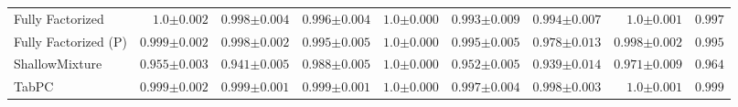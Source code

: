 \begin{tabular}{lrrrrrrr|r}
    \midrule
    Fully Factorized & $1.0${\tiny${\pm 0.002}$} & $0.998${\tiny${\pm 0.004}$} & $0.996${\tiny${\pm 0.004}$} & $1.0${\tiny${\pm 0.000}$} & $0.993${\tiny${\pm 0.009}$} & $0.994${\tiny${\pm 0.007}$} & $1.0${\tiny${\pm 0.001}$} & $0.997$ \\
    Fully Factorized (P) & $0.999${\tiny${\pm 0.002}$} & $0.998${\tiny${\pm 0.002}$} & $0.995${\tiny${\pm 0.005}$} & $1.0${\tiny${\pm 0.000}$} & $0.995${\tiny${\pm 0.005}$} & $0.978${\tiny${\pm 0.013}$} & $0.998${\tiny${\pm 0.002}$} & $0.995$ \\
    ShallowMixture & $0.955${\tiny${\pm 0.003}$} & $0.941${\tiny${\pm 0.005}$} & $0.988${\tiny${\pm 0.005}$} & $1.0${\tiny${\pm 0.000}$} & $0.952${\tiny${\pm 0.005}$} & $0.939${\tiny${\pm 0.014}$} & $0.971${\tiny${\pm 0.009}$} & $0.964$ \\
    TabPC & $0.999${\tiny${\pm 0.002}$} & $0.999${\tiny${\pm 0.001}$} & $0.999${\tiny${\pm 0.001}$} & $1.0${\tiny${\pm 0.000}$} & $0.997${\tiny${\pm 0.004}$} & $0.998${\tiny${\pm 0.003}$} & $1.0${\tiny${\pm 0.001}$} & $0.999$ \\
    \bottomrule[1.0pt]
\end{tabular}